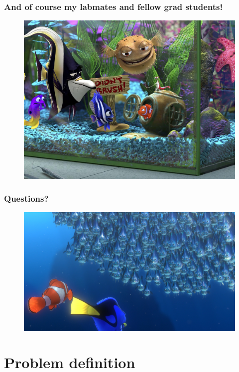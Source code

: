 \documentclass{beamer}
\begin{document}
\begin{frame}
	\frametitle{And of course my labmates and fellow grad students!}
	\begin{figure}
		\centering
		\includegraphics[width=\linewidth]{labmates}
	\end{figure}
\end{frame}

\begin{frame}
	\frametitle{Questions?}
	\begin{figure}
		\centering
		\includegraphics[width=\linewidth]{questions}
	\end{figure}
\end{frame}

\section{Problem definition}
\end{document}
